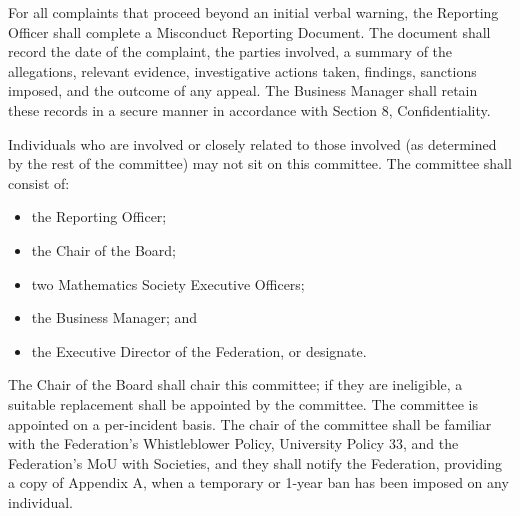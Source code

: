 For all complaints that proceed beyond an initial verbal warning, the Reporting Officer shall complete a Misconduct Reporting Document. The document shall record the date of the complaint, the parties involved, a summary of the allegations, relevant evidence, investigative actions taken, findings, sanctions imposed, and the outcome of any appeal. The Business Manager shall retain these records in a secure manner in accordance with Section 8, Confidentiality.

Individuals who are involved or closely related to those involved (as determined by the rest of the committee) may not sit on this committee. The committee shall consist of:
\begin{itemize}
	\item the Reporting Officer;
	\item the Chair of the Board;
	\item two Mathematics Society Executive Officers;
	\item the Business Manager; and
	\item the Executive Director of the Federation, or designate.
\end{itemize}
The Chair of the Board shall chair this committee; if they are ineligible, a suitable replacement shall be appointed by the committee. The committee is appointed on a per-incident basis. The chair of the committee shall be familiar with the Federation's Whistleblower Policy, University Policy 33, and the Federation's MoU with Societies, and they shall notify the Federation, providing a copy of Appendix A, when a temporary or 1-year ban has been imposed on any individual.

